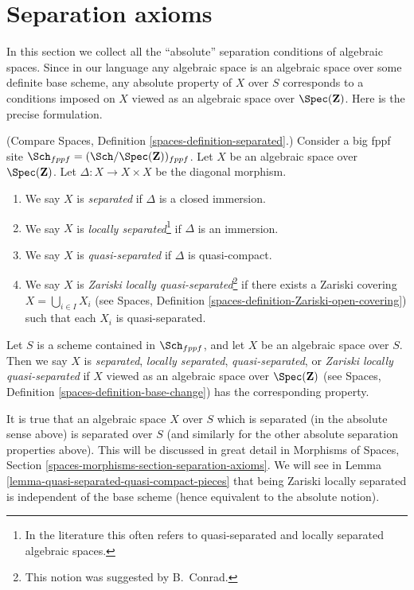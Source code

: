 \section{Separation axioms}
\label{section-separation}

\noindent
In this section we collect all the ``absolute'' separation conditions
of algebraic spaces. Since in our language any algebraic space is an
algebraic space over some definite base scheme, any absolute property
of $X$ over $S$ corresponds to a conditions imposed on $X$ viewed
as an algebraic space over $\Spec(\mathbf{Z})$. Here is the
precise formulation.

\begin{definition}
\label{definition-separated}
(Compare Spaces, Definition \ref{spaces-definition-separated}.)
Consider a big fppf site
$\Sch_{fppf} = (\Sch/\Spec(\mathbf{Z}))_{fppf}$.
Let $X$ be an algebraic space over
$\Spec(\mathbf{Z})$. Let $\Delta : X \to X \times X$
be the diagonal morphism.
\begin{enumerate}
\item We say $X$ is {\it separated} if $\Delta$ is a closed immersion.
\item We say $X$ is {\it locally separated}\footnote{In the
literature this often refers to quasi-separated and locally
separated algebraic spaces.} if $\Delta$ is an
immersion.
\item We say $X$ is {\it quasi-separated} if $\Delta$ is quasi-compact.
\item We say $X$ is {\it Zariski locally quasi-separated}\footnote{
This notion was suggested by B.\ Conrad.} if there
exists a Zariski covering $X = \bigcup_{i \in I} X_i$ (see Spaces,
Definition \ref{spaces-definition-Zariski-open-covering}) such that
each $X_i$ is quasi-separated.
\end{enumerate}
Let $S$ is a scheme contained in $\Sch_{fppf}$, and let
$X$ be an algebraic space over $S$. Then we say $X$ is {\it separated},
{\it locally separated}, {\it quasi-separated}, or
{\it Zariski locally quasi-separated}
if $X$ viewed as an algebraic space over $\Spec(\mathbf{Z})$ (see
Spaces, Definition \ref{spaces-definition-base-change})
has the corresponding property.
\end{definition}

\noindent
It is true that an algebraic space $X$ over $S$ which is separated
(in the absolute sense above) is separated over $S$ (and similarly
for the other absolute separation properties above). This will be discussed
in great detail in
Morphisms of Spaces, Section \ref{spaces-morphisms-section-separation-axioms}.
We will see in
Lemma \ref{lemma-quasi-separated-quasi-compact-pieces}
that being Zariski locally separated is independent of the base scheme
(hence equivalent to the absolute notion).

